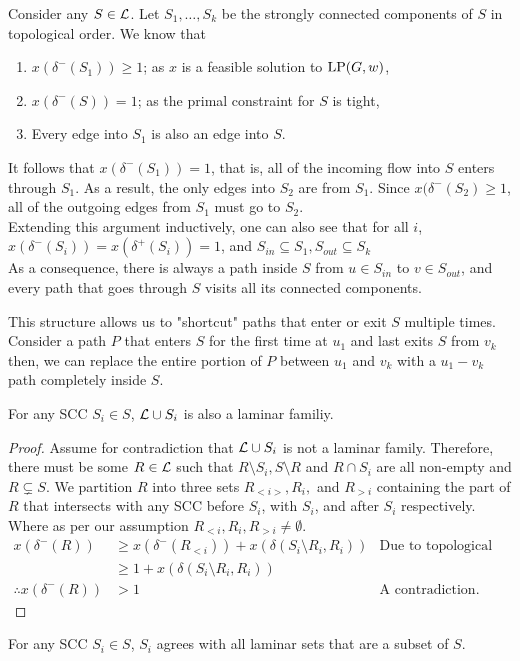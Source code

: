 
	Consider any $S\in \mathcal{L}$. Let $S_1,\dots, S_k$ be the strongly connected components of $S$ in topological order.
	We know that
	\begin{enumerate}
		\item $x(\delta^-(S_1)) \geqslant 1$; as $x$ is a feasible solution to $\textup{LP}(G,w)$,
		\item $x(\delta^-(S)) = 1$; as the primal constraint for $S$ is tight,
		\item Every edge into $S_1$ is also an edge into $S$.
	\end{enumerate}
	It follows that $x(\delta^-(S_1)) = 1$, that is, all of the incoming flow into $S$ enters through $S_1$. As a result, the only edges into $S_2$ are from $S_1$. Since $x(\delta^-(S_2)\geqslant 1$, all of the outgoing edges from $S_1$ must go to $S_2$.
	\\Extending this argument inductively, one can also see that for all $i$, $x(\delta^-(S_i)) = x(\delta^+(S_i)) = 1$, and $S_{in}\subseteq S_1,S_{out}\subseteq S_k$
	\\As a consequence, there is always a path inside $S$ from $u\in S_{in}$ to $v\in S_{out}$, and every path that goes through $S$ visits all its connected components.

	This structure allows us to "shortcut" paths that enter or exit $S$ multiple times. Consider a path $P$ that enters $S$ for the first time at $u_1$ and last exits $S$ from $v_k$ then, we can replace the entire portion of $P$ between $u_1$ and $v_k$ with a $u_1 - v_k$ path completely inside $S$.\\

	\begin{lemma}\label{lemm:2:SiAgree}
		For any SCC $S_i \in S$, $\mathcal{L} \cup S_i$ is also a laminar familiy.
	\end{lemma}
	\begin{proof}
		Assume for contradiction that $\mathcal{L} \cup S_i$ is not a laminar family.
		Therefore, there must be some $R \in \mathcal{L}$ such that $R\setminus S_i, S\setminus R$ and $R \cap S_i$ are all non-empty and $R \subsetneq S$.
		We partition $R$ into three sets $R_{<i>}, R_i,$ and $R_{>i}$ containing the part of $R$ that intersects with any SCC before $S_i$, with $S_i$, and after $S_i$ respectively. Where as per our assumption $R_{<i}, R_i, R_{>i} \ne \emptyset$.
		\begin{align*}
			x(\delta^-(R)) &\geqslant x(\delta^-(R_{<i})) + x(\delta(S_i\setminus R_i, R_i)) & \text{Due to topological order.}\\
			&\geqslant 1 + x(\delta(S_i\setminus R_i, R_i))\\
			\therefore x(\delta^-(R)) &>1 & \text{A contradiction.}
		\end{align*}
	\end{proof}
	\begin{corollary}
		For any SCC $S_i \in S$, $S_i$ agrees with all laminar sets that are a subset of $S$.
	\end{corollary}

